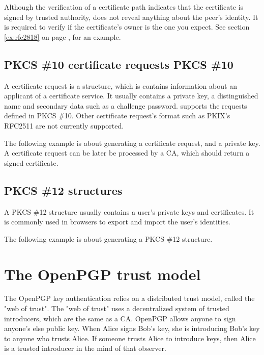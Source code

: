 \par
Although the verification of a certificate path indicates that the
certificate is signed by trusted authority, does not reveal anything
about the peer's identity. It is required to verify if the certificate's
owner is the one you expect. See section \ref{ex:rfc2818} on page \pageref{ex:rfc2818},
for an example.


\subsection*{PKCS \#10 certificate requests\index
{PKCS \#10}}
A certificate request is a structure, which
is contains information about an applicant of a certificate service.
It usually contains a private key, a distinguished name and secondary
data such as a challenge password. \gnutls{} supports the requests
defined in PKCS \#10. Other certificate request's format such as
PKIX's RFC2511 are not currently supported.
\par
The following example is about generating a certificate request, and
a private key. A certificate request can be later be processed by a CA,
which should return a signed certificate.



\subsection*{PKCS \#12 structures}
A PKCS \#12 structure usually contains a user's private keys and
certificates. It is commonly used in browsers to export and import
the user's identities.

\par
The following example is about generating a PKCS \#12 structure.




\section{The OpenPGP trust model}
\label{pgp:trust}

The OpenPGP key authentication relies on a distributed trust model, called
the "web of trust". The "web of trust" uses a decentralized system of 
trusted introducers, which are the same as a CA. OpenPGP allows anyone to 
sign anyone's else public key. When Alice signs Bob's key, she is introducing 
Bob's key to anyone who trusts Alice. If someone trusts Alice to introduce
keys, then Alice is a trusted introducer in the mind of that observer.

